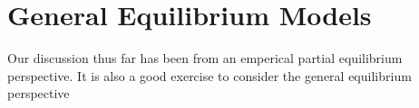 \section{General Equilibrium Models}

Our discussion thus far has been from an emperical partial equilibrium perspective. It is also a good exercise to consider the general equilibrium perspective
